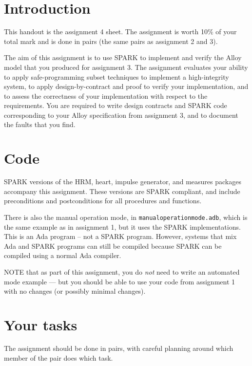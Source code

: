 \documentclass[a4paper,11pt]{article}
\begin{document}

\section{Introduction}

This handout is the assignment 4 sheet. The assignment is worth 10\% of your total mark and is done in pairs (the same pairs as assignment 2 and 3).

The aim of this assignment is to use SPARK to implement and verify the Alloy model that you produced for assignment 3. The assignment evaluates your ability to apply safe-programming subset techniques to implement a high-integrity system, to apply design-by-contract and proof to verify your implementation, and to assess the correctness of your implementation with respect to the requirements. You are required to write design contracts and SPARK code corresponding to your Alloy specification from assignment 3, and to document the faults that you find.

\section{Code}

SPARK versions of the HRM, heart,  impulse generator, and measures packages accompany this assignment. These versions are SPARK compliant, and include preconditions and postconditions for all procedures and functions. 

There is also the manual operation mode, in \texttt{manualoperationmode.adb}, which is the same example as in assignment 1, but it uses the SPARK implementations. This is an Ada program -- not a SPARK program. However, systems that mix Ada and SPARK programs can still be compiled because SPARK can be compiled using a normal Ada compiler.

NOTE that as part of this assignment, you do \emph{not} need to write an automated mode example --- but you should be able to use your code from assignment 1 with no changes (or possibly minimal changes).

\section{Your tasks}

The assignment should be done in pairs, with careful planning around which member of the pair does which task.
\end{document}
